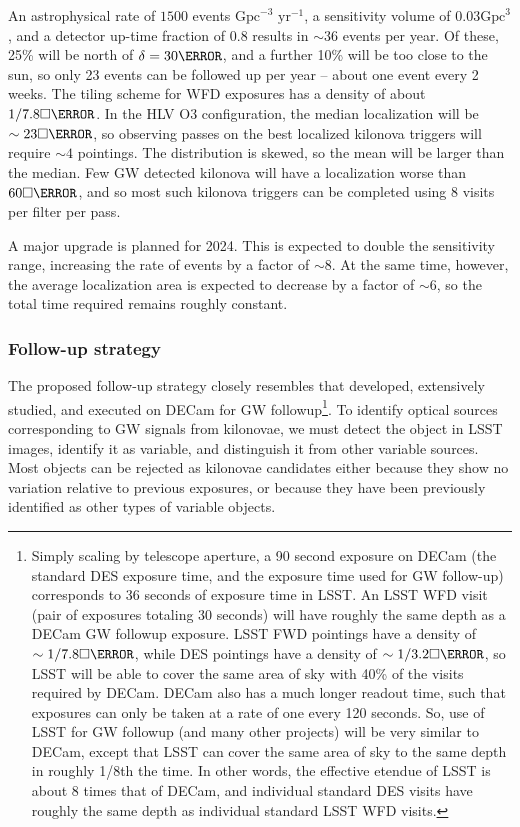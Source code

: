 An astrophysical rate of $1500$ events $\mbox{Gpc}^{-3}$ $\mbox{yr}^{-1}$, a sensitivity volume of $0.03 \mbox{Gpc}^3$, and a detector up-time fraction of $0.8$ results in $\sim 36$ events per year. Of these, 25\% will be north of $\delta=30\degree$, and a further 10\% will be too close to the sun, so only 23 events can be followed up per year -- about one event every 2 weeks. The tiling scheme for WFD exposures has a density of about $1/7.8\square\degree$. In the HLV O3 configuration, the median localization will be $\sim 23 \square\degree$, so observing passes on the best localized kilonova triggers will require $\sim 4$ pointings. The distribution is skewed, so the mean will be larger than the median. Few GW detected kilonova will have a localization worse than $60 \square \degree$, and so most such kilonova triggers can be completed using 8 visits per filter per pass.

A major upgrade is planned for 2024. This is expected to double the sensitivity range, increasing the rate of events by a factor of $\sim8$. At the same time, however, the average localization area is expected to decrease by a factor of $\sim6$, so the total time required remains roughly constant.


\subsubsection{Follow-up strategy}

The proposed follow-up strategy closely resembles that developed, extensively studied, and executed on DECam for GW followup\footnote{Simply scaling by telescope aperture, a 90 second exposure on DECam (the standard DES exposure time, and the exposure time used for GW follow-up) corresponds to 36 seconds of exposure time in LSST. An LSST WFD visit (pair of exposures totaling 30 seconds) will have roughly the same depth as a DECam GW followup exposure. LSST FWD pointings have a density of $\sim 1/7.8\square\degree$, while DES pointings have a density of $\sim 1/3.2\square\degree$, so LSST will be able to cover the same area of sky with 40\% of the visits required by DECam.  DECam also has a much longer readout time, such that exposures can only be taken at a rate of one every 120 seconds. So, use of LSST for GW followup (and many other projects) will be very similar to DECam, except that LSST can cover the same area of sky to the same depth in roughly 1/8th the time. In other words, the effective etendue of LSST is about 8 times that of DECam, and individual standard DES visits have roughly the same depth as individual standard LSST WFD visits.}\citep{decamfollowupdetails, 2017ApJ...848L..16S, 2016ApJ...826L..29C, 2016ApJ...823L..33S}. To identify optical sources corresponding to GW signals from kilonovae, we must detect the object in LSST images, identify it as variable, and distinguish it from other variable sources. Most objects can be rejected as kilonovae candidates either because they show no variation relative to previous exposures, or because they have been previously identified as other types of variable objects.


